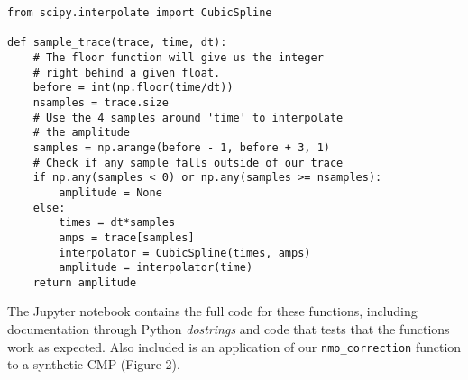 \begin{verbatim}
from scipy.interpolate import CubicSpline

def sample_trace(trace, time, dt):
    # The floor function will give us the integer
    # right behind a given float.
    before = int(np.floor(time/dt))
    nsamples = trace.size
    # Use the 4 samples around 'time' to interpolate
    # the amplitude
    samples = np.arange(before - 1, before + 3, 1)
    # Check if any sample falls outside of our trace
    if np.any(samples < 0) or np.any(samples >= nsamples):
        amplitude = None
    else:
        times = dt*samples
        amps = trace[samples]
        interpolator = CubicSpline(times, amps)
        amplitude = interpolator(time)
    return amplitude
\end{verbatim}

The Jupyter notebook contains the full code for these functions, including
documentation through Python \textit{dostrings} and code that tests that the
functions work as expected.
Also included is an application of our \texttt{nmo_correction} function to a
synthetic CMP (Figure 2).
